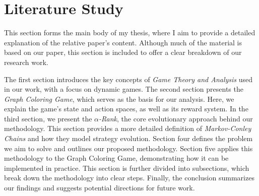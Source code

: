 \section{Literature Study}

    This section forms the main body of my thesis, where I aim to provide a detailed explanation of the relative paper's content. Although much of the material is based on our paper, this section is included to offer a clear breakdown of our research work.\tinydouble

    \noindent
    The first section introduces the key concepts of \emph{Game Theory and Analysis} used in our work, with a focus on dynamic games. The second section presents the \emph{Graph Coloring Game}, which serves as the basis for our analysis. Here, we explain the game's state and action spaces, as well as its reward system. In the third section, we present the \emph{$\alpha$-Rank}, the core evolutionary approach behind our methodology. This section provides a more detailed definition of \emph{Markov-Conley Chains} and how they model strategy evolution. Section four defines the problem we aim to solve and outlines our proposed methodology. Section five applies this methodology to the Graph Coloring Game, demonstrating how it can be implemented in practice. This section is further divided into subsections, which break down the methodology into clear steps. Finally, the conclusion summarizes our findings and suggests potential directions for future work.

\newpage


\newpage


\newpage


\newpage


\newpage


\newpage


\newpage